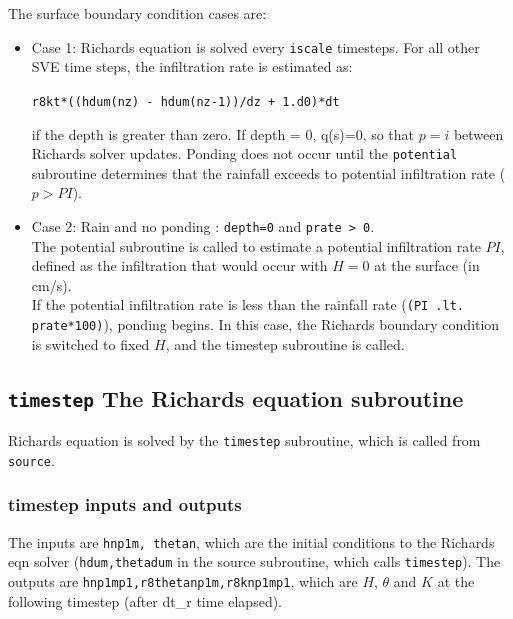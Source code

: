 \documentclass{article}
\newcommand{\code}[1]{\texttt{#1}}
\begin{document}
	
 



The  surface boundary condition cases are:

\begin{itemize}
	\item  Case 1: Richards equation is solved every \code{iscale} timesteps. 
		  For all other SVE time steps, the infiltration rate is estimated as:
		  \begin{center}
			\code{r8kt*((hdum(nz) - hdum(nz-1))/dz + 1.d0)*dt} 		  	
		  \end{center}
			if the depth is greater than zero.   If depth = 0, q(s)=0, so that $p = i $ between Richards solver updates.  Ponding does not occur until the \code{potential} subroutine determines that the rainfall exceeds to potential infiltration rate ($p>PI$). 		
		
	\item Case 2: Rain and no ponding : \code{depth=0} and \code{prate > 0}. \\
		 The potential subroutine is called to estimate a potential infiltration rate $PI$, defined as the infiltration that would occur with $H=0$ at the surface (in cm/s). \\  
	    If the potential infiltration rate is less than the rainfall rate (\code{(PI .lt. prate*100)}), ponding begins.  In this case, the Richards boundary condition is switched to fixed $H$, and the timestep subroutine is called. 

	
\end{itemize}
	



\subsection{\code{timestep} The Richards equation subroutine }

Richards equation is solved by the \code{timestep} subroutine, which is called from \code{source}.
	
\subsubsection*{timestep inputs and outputs }
The inputs are \code{hnp1m, thetan}, which are the initial conditions to the Richards eqn solver (\code{hdum,thetadum} in the source subroutine, which calls \code{timestep}).  
The outputs are  \code{hnp1mp1,r8thetanp1m,r8knp1mp1}, which are  $H$, $\theta$ and $K$ at the following timestep (after dt\_r  time elapsed).
\end{document}
